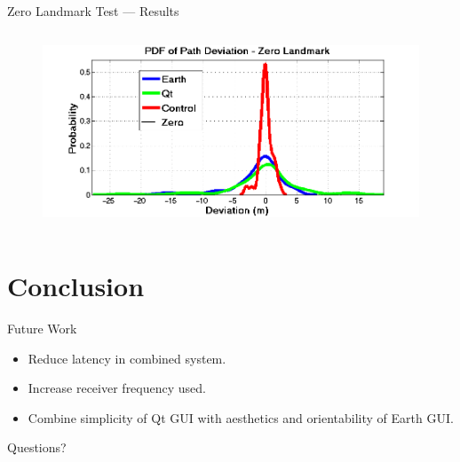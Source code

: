 \documentclass{beamer}
\begin{document}
\begin{frame}{Zero Landmark Test --- Results}
\begin{columns}
\begin{column}{0.5\textwidth}
\begin{figure}
          \end{figure}
          \vspace{-20pt}
          \begin{figure}
            \includegraphics[width=\textwidth]{../graphics/pdf_zero_landmark_deviation.png}
          \end{figure}
        \end{column}
      \end{columns}
    \end{frame}



\section{Conclusion}

  \begin{frame}{Future Work}
    \begin{itemize}
      \item Reduce latency in combined system.
      \item Increase receiver frequency used.
      \item Combine simplicity of Qt GUI with aesthetics and orientability of Earth GUI.
    \end{itemize}
  \end{frame}

  \begin{frame}{}
    \centering \Huge Questions?
  \end{frame}
\end{document}
